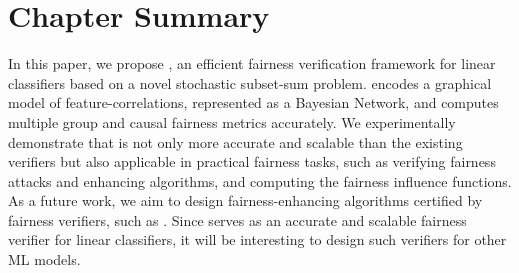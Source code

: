 \section{Chapter Summary}
In this paper, we propose {\fvgm}, an efficient fairness verification framework for linear classifiers based on a novel stochastic subset-sum problem. {\fvgm} encodes a graphical model of feature-correlations, represented as a Bayesian Network, and computes multiple group and causal fairness metrics accurately. We experimentally demonstrate that {\fvgm} is not only more accurate and scalable than the existing verifiers but also applicable in practical fairness tasks, such as verifying fairness attacks and enhancing algorithms, and computing the fairness influence functions. 
As a future work, we aim to design fairness-enhancing algorithms certified by fairness verifiers, such as {\fvgm}. %
Since {\fvgm} serves as an accurate and scalable fairness verifier for linear classifiers, it will be interesting to design such verifiers for other ML models.


